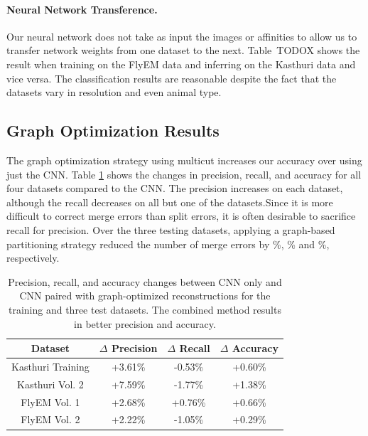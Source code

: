 \paragraph{Neural Network Transference.}

Our neural network does not take as input the images or affinities to allow us to transfer network weights from one dataset to the next.
Table~TODO{X} shows the result when training on the FlyEM data and inferring on the Kasthuri data and vice versa.
The classification results are reasonable despite the fact that the datasets vary in resolution and even animal type.


\subsection{Graph Optimization Results}

The graph optimization strategy using multicut increases our accuracy over using just the CNN.
Table \ref{table:multicut} shows the changes in precision, recall, and accuracy for all four datasets compared to the CNN.
The precision increases on each dataset, although the recall decreases on all but one of the datasets.Since it is more difficult to correct merge errors than split errors, it is often desirable to sacrifice recall for precision.
Over the three testing datasets, applying a graph-based partitioning strategy reduced the number of merge errors by \%, \% and \%, respectively. 

\begin{table}[h]
	\centering
	\small
	\begin{tabular}{c c c c} \hline
		\textbf{Dataset} & $\Delta$ \textbf{Precision} & $\Delta$ \textbf{Recall} & $\Delta$ \textbf{Accuracy} \\ \hline
		Kasthuri Training & +3.61\% & -0.53\% & +0.60\% \\
		Kasthuri Vol. 2 & +7.59\% & -1.77\% & +1.38\% \\
		FlyEM Vol. 1 & +2.68\% & +0.76\% & +0.66\% \\
		FlyEM Vol. 2 & +2.22\% & -1.05\% & +0.29\% \\ \hline
	\end{tabular}
	\caption{Precision, recall, and accuracy changes between CNN only and CNN paired with graph-optimized reconstructions for the training and three test datasets. The combined method results in better precision and accuracy.}
	\label{table:multicut}
\end{table}

